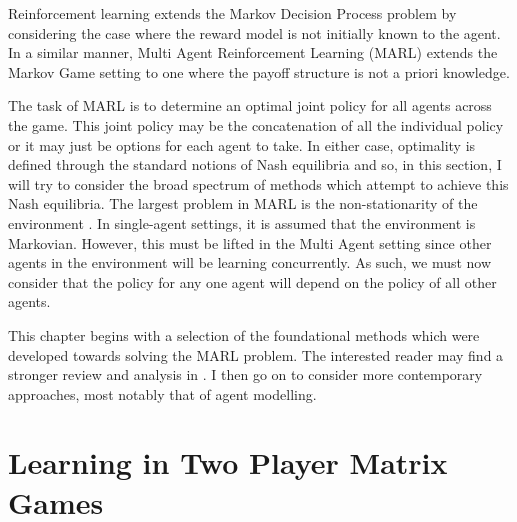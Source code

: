 \documentclass[../sample.tex]{subfiles}
\begin{document}
Reinforcement learning extends the Markov Decision Process problem by considering the case where the
reward model is not initially known to the agent. In a similar manner, Multi Agent Reinforcement
Learning (MARL) extends the Markov Game setting to one where the payoff structure is not a priori
knowledge. 

The task of MARL is to determine an optimal joint policy for all agents across the game. This joint
policy may be the concatenation of all the individual policy or it may just be options for each
agent to take. In either case, optimality is defined through the standard notions of Nash equilibria
and so, in this section, I will try to consider the broad spectrum of methods which attempt to
achieve this Nash equilibria. The largest problem in MARL is the non-stationarity of the environment
\cite{Hernandez-LealA}. In single-agent settings, it is assumed that the environment is Markovian.
However, this must be lifted in the Multi Agent setting since other agents in the environment will
be learning concurrently. As such, we must now consider that the policy for any one agent will
depend on the policy of all other agents. 

This chapter begins with a selection of the foundational methods which were developed towards
solving the MARL problem. The interested reader may find a stronger review and analysis in
\cite{SchwartzMulti-agentApproach}. I then go on to consider more contemporary approaches, most
notably that of agent modelling. 

\section{Learning in Two Player Matrix Games}
\end{document}
